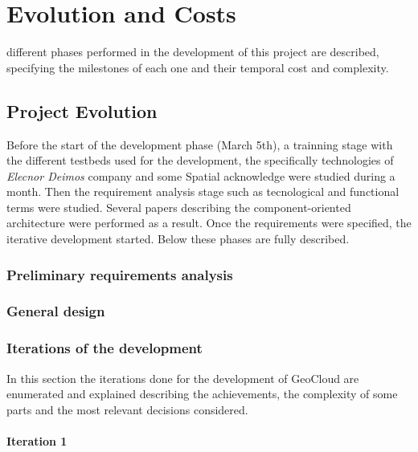 \chapter{Evolution and Costs}
\label{chap:evolution}
 different phases performed in the development of this project are described,
specifying the milestones of each one and their temporal cost and complexity.


\section{Project Evolution}
\label{section:evolution}

Before the start of the development phase (March 5th), a trainning stage with
the different testbeds used for the development, the specifically technologies of
\emph{Elecnor Deimos} company and some Spatial acknowledge were studied during a month. Then the
requirement analysis stage such as tecnological and functional terms were
studied. Several papers describing the component-oriented architecture were
performed as a result. Once the requirements were specified, the iterative
development started. Below these phases are fully described.


\subsection{Preliminary requirements analysis}

\subsection{General design}

\subsection{Iterations of the development}

In this section the iterations done for the development of GeoCloud are
enumerated and explained describing the achievements, the complexity of some
parts and the most relevant decisions considered.

\subsubsection{Iteration 1}


